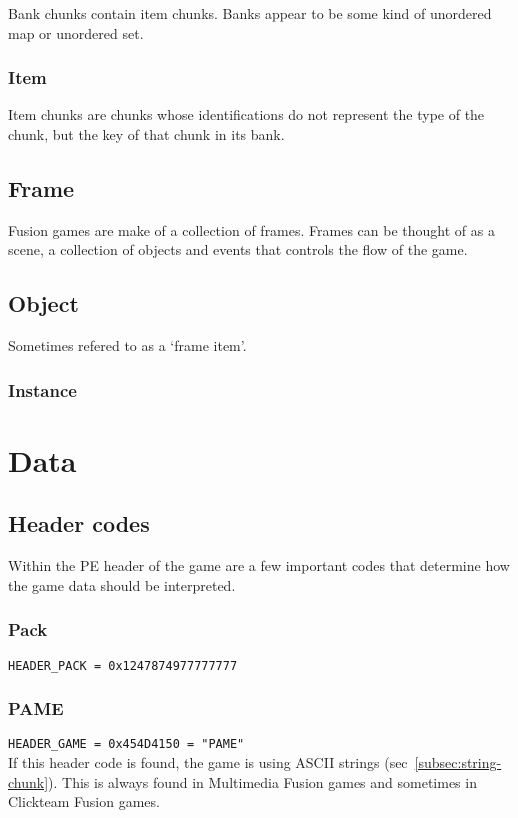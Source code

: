 \documentclass{article}
\begin{document}
Bank chunks contain item chunks.
Banks appear to be some kind of unordered map or unordered set.

\subsubsection{Item}

Item chunks are chunks whose identifications do not represent the
type of the chunk, but the key of that chunk in its bank.

\subsection{Frame}

Fusion games are make of a collection of frames.
Frames can be thought of as a scene, a collection of objects and events that
controls the flow of the game.

\subsection{Object}

Sometimes refered to as a `frame item'.

\subsubsection{Instance}


\section{Data}

\subsection{Header codes}
Within the PE header of the game are a few important codes that determine how
the game data should be interpreted.

\subsubsection{Pack}
\verb|HEADER_PACK = 0x1247874977777777|

\subsubsection{PAME}
\label{subsubsec:PAME}
\verb|HEADER_GAME = 0x454D4150 = "PAME"|
\\
If this header code is found, the game is using ASCII strings
(sec~\ref{subsec:string-chunk}).
This is always found in Multimedia Fusion games and sometimes in Clickteam
Fusion games.
\end{document}
